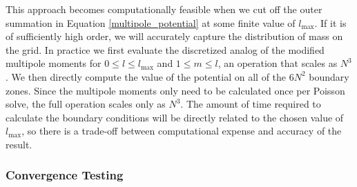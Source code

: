 \documentclass[12pt,preprint]{aastex}
\begin{document}

This approach becomes computationally feasible when we cut off the outer summation in Equation \ref{multipole_potential} at some finite value of $l_{\text{max}}$. If it is of sufficiently high order, we will accurately capture the distribution of mass on the grid. In practice we first evaluate the discretized analog of the modified multipole moments for $0 \leq l \leq l_{\text{max}}$ and $1 \leq m \leq l$, an operation that scales as $N^3$. We then directly compute the value of the potential on all of the $6N^2$ boundary zones. Since the multipole moments only need to be calculated once per Poisson solve, the full operation scales only as $N^3$. The amount of time required to calculate the boundary conditions will be directly related to the chosen value of $l_{\text{max}}$, so there is a trade-off between computational expense and accuracy of the result.


\subsubsection{Convergence Testing}\label{sec:gravity_convergence_testing}
\end{document}
